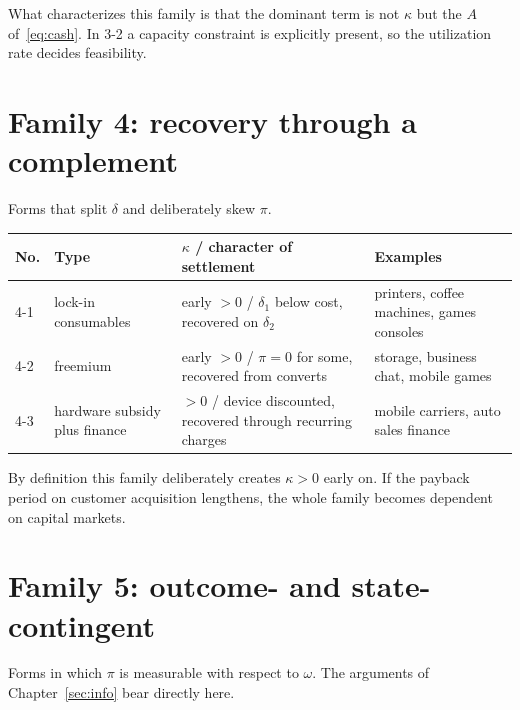 What characterizes this family is that the dominant term is not $\kappa$ but the $A$
of~\eqref{eq:cash}. In 3-2 a capacity constraint is explicitly present, so the utilization
rate decides feasibility.

\section{Family 4: recovery through a complement}

Forms that split $\delta$ and deliberately skew $\pi$.

\begin{center}
\begin{tabularx}{\textwidth}{@{}llXX@{}}
\toprule
No. & Type & $\kappa$ / character of settlement & Examples \\
\midrule
4-1 & lock-in consumables & early $>0$ / $\delta_1$ below cost, recovered on $\delta_2$ & printers, coffee machines, games consoles \\
4-2 & freemium & early $>0$ / $\pi=0$ for some, recovered from converts & storage, business chat, mobile games \\
4-3 & hardware subsidy plus finance & $>0$ / device discounted, recovered through recurring charges & mobile carriers, auto sales finance \\
\bottomrule
\end{tabularx}
\label{tab:family-4-catalog}
\end{center}

By definition this family deliberately creates $\kappa>0$ early on. If the payback period on
customer acquisition lengthens, the whole family becomes dependent on capital markets.

\section{Family 5: outcome- and state-contingent}

Forms in which $\pi$ is measurable with respect to $\omega$. The arguments of
Chapter~\ref{sec:info} bear directly here.

